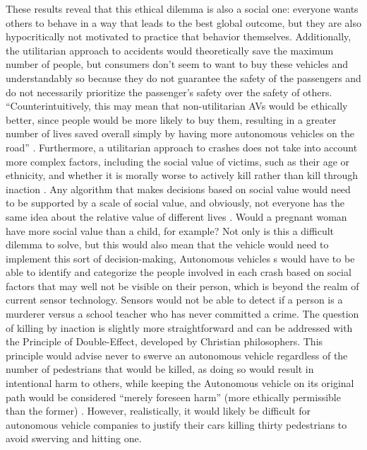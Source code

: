 \documentclass[10pt,twocolumn]{article}
\begin{document}
These results reveal that this ethical dilemma is also a social one: everyone wants others to behave in a way that leads to the best global outcome, but they are also hypocritically not motivated to practice that behavior themselves. Additionally, the utilitarian approach to accidents would theoretically save the maximum number of people, but consumers don’t seem to want to buy these vehicles and understandably so because they do not guarantee the safety of the passengers and do not necessarily prioritize the passenger’s safety over the safety of others. “Counterintuitively, this may mean that non-utilitarian AVs would be ethically better, since people would be more likely to buy them, resulting in a greater number of lives saved overall simply by having more autonomous vehicles on the road” \cite{AutonomousAccidents}. Furthermore, a utilitarian approach to crashes does not take into account more complex factors, including the social value of victims, such as their age or ethnicity, and whether it is morally worse to actively kill rather than kill through inaction \cite{AutonomousAccidents}. Any algorithm that makes decisions based on social value would need to be supported by a scale of social value, and obviously, not everyone has the same idea about the relative value of different lives  \cite{AutonomousAccidents}. Would a pregnant woman have more social value than a child, for example? Not only is this a difficult dilemma to solve, but this would also mean that the vehicle would need to implement this sort of decision-making, Autonomous vehicles s would have to be able to identify and categorize the people involved in each crash based on social factors that may well not be visible on their person, which is beyond the realm of current sensor technology. Sensors would not be able to detect if a person is a murderer versus a school teacher who has never committed a crime. The question of killing by inaction is slightly more straightforward and can be addressed with the Principle of Double-Effect, developed by Christian philosophers. This principle would advise never to swerve an autonomous vehicle regardless of the number of pedestrians that would be killed, as doing so would result in intentional harm to others, while keeping the Autonomous vehicle on its original path would be considered “merely foreseen harm” (more ethically permissible than the former)  \cite{AutonomousAccidents}. However, realistically, it would likely be difficult for autonomous vehicle companies to justify their cars killing thirty pedestrians to avoid swerving and hitting one. 
\end{document}
